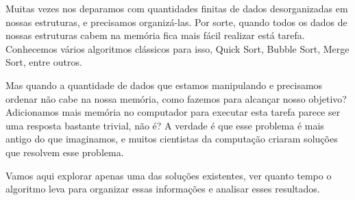 Muitas vezes nos deparamos com quantidades finitas de dados desorganizadas em nossas estruturas, e precisamos organizá-las. Por sorte, quando todos os dados de nossas estruturas cabem na memória fica mais fácil realizar está tarefa. Conhecemos vários algoritmos clássicos para isso, Quick Sort, Bubble Sort, Merge Sort, entre outros.\par
Mas quando a quantidade de dados que estamos manipulando e precisamos ordenar não cabe na nossa memória, como fazemos para alcançar nosso objetivo? Adicionamos mais memória no computador para executar esta tarefa parece ser uma resposta bastante trivial, não é? A verdade é que esse problema é mais antigo do que imaginamos, e muitos cientistas da computação criaram soluções que resolvem esse problema.\par
Vamos aqui explorar apenas uma das soluções existentes, ver quanto tempo o algoritmo leva para organizar essas informações e analisar esses resultados.

